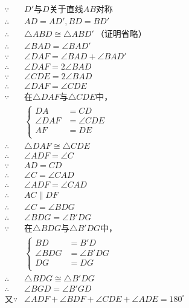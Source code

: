 \begin{align*}
  \because  {}& \text{$D'$与$D$关于直线$AB$对称} \\
  \therefore{}& AD = AD', BD = BD' \\
  \therefore{}& \triangle ABD \cong \triangle ABD'\ \text{（证明省略）} \\
  \therefore{}& \angle BAD = \angle BAD' \\
  \because  {}& \angle DAF = \angle BAD + \angle BAD' \\
  \therefore{}& \angle DAF = 2\angle BAD \\
  \because  {}& \angle CDE = 2\angle BAD \\
  \therefore{}& \angle DAF = \angle CDE \\
  \because  {}& \text{在$\triangle DAF$与$\triangle CDE$中，} \\
  & \left\{ \begin{aligned}
    DA &= CD \\ \angle DAF &= \angle CDE \\ AF &= DE \\
  \end{aligned} \right. \\
  \therefore{}& \triangle DAF \cong \triangle CDE \\
  \therefore{}& \angle ADF = \angle C \\
  \because  {}& AD = CD \\
  \therefore{}& \angle C = \angle CAD \\
  \therefore{}& \angle ADF = \angle CAD \\
  \therefore{}& AC \parallel DF \\
  \therefore{}& \angle C = \angle BDG \\
  \therefore{}& \angle BDG = \angle B'DG \\
  \because  {}& \text{在$\triangle BDG$与$\triangle B'DG$中，} \\
  & \left\{ \begin{aligned}
    BD &= B'D \\ \angle BDG &= \angle B'DG \\ DG &= DG \\
  \end{aligned} \right. \\
  \therefore{}& \triangle BDG \cong \triangle B'DG \\
  \therefore{}& \angle BGD = \angle B'GD \\
  \text{又}\because{}& \angle ADF + \angle BDF + \angle CDE + \angle ADE = 180^\circ \\

\end{align*}
